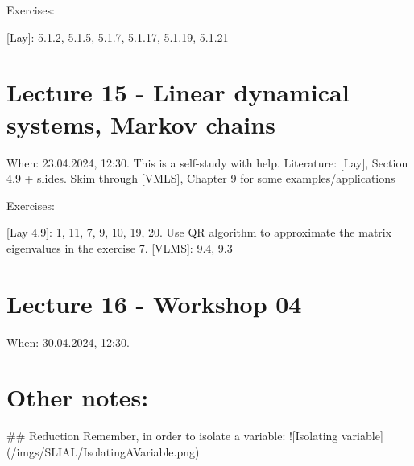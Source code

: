 \documentclass[11pt,oneside,a4paper,openright]{article}
\begin{document}
Exercises:

[Lay]: 5.1.2, 5.1.5, 5.1.7, 5.1.17, 5.1.19, 5.1.21

\section*{Lecture 15 - Linear dynamical systems, Markov chains}

When: 23.04.2024, 12:30. This is a self-study with help.
Literature: [Lay], Section 4.9 + slides. Skim through [VMLS], Chapter 9 for some examples/applications

Exercises:

[Lay 4.9]: 1, 11, 7, 9, 10, 19, 20. Use QR algorithm to approximate the matrix eigenvalues in the exercise 7.
[VLMS]: 9.4, 9.3

\section*{Lecture 16 - Workshop 04}

When: 30.04.2024, 12:30.

\section*{Other notes:}
## Reduction
Remember, in order to isolate a variable:
![Isolating variable](/imgs/SLIAL/IsolatingAVariable.png)
\end{document}

